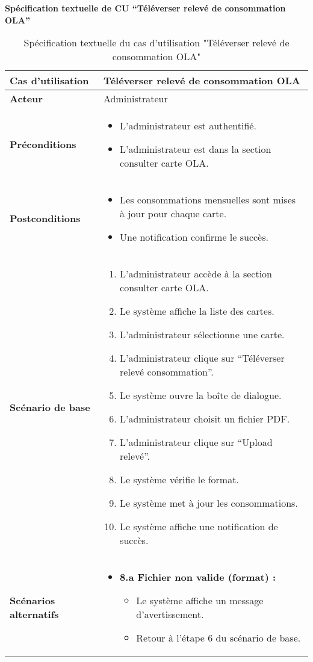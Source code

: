 \documentclass[a4paper,11pt]{report}
\begin{document}
\newpage
\textbf{Spécification textuelle de CU “Téléverser relevé de consommation OLA”}

\begin{table}[H]
  \centering
  \renewcommand{\arraystretch}{1.5}
  \caption{Spécification textuelle du cas d'utilisation "Téléverser relevé de consommation OLA"}
  \begin{tabularx}{\textwidth}{|l|X|}
    \hline
    \textbf{Cas d'utilisation} & Téléverser relevé de consommation OLA \\ \hline
    \textbf{Acteur}            & Administrateur \\ \hline
    \textbf{Préconditions}     & 
      \begin{itemize}
        \item L’administrateur est authentifié.
        \item L'administrateur est dans la section consulter carte OLA.
      \end{itemize} \\ \hline
    \textbf{Postconditions}    & 
      \begin{itemize}
        \item Les consommations mensuelles sont mises à jour pour chaque carte.
        \item Une notification confirme le succès.
      \end{itemize} \\ \hline
    \textbf{Scénario de base}  & 
      \begin{enumerate}
        \item L’administrateur accède à la section consulter carte OLA.
        \item Le système affiche la liste des cartes.
        \item L'administrateur sélectionne une carte.
        \item L'administrateur clique sur “Téléverser relevé consommation”.
        \item Le système ouvre la boîte de dialogue.
        \item L'administrateur  choisit un fichier PDF.
        \item L'administrateur clique sur “Upload relevé”.
        \item Le système vérifie le format.
        \item Le système met à jour les consommations.
        \item Le système affiche une notification de succès.
      \end{enumerate} \\ \hline
    \textbf{Scénarios alternatifs} & 
\begin{itemize}
  \item \textbf{8.a Fichier non valide (format) :}
  \begin{itemize}
    \item Le système affiche un message d'avertissement.
    \item Retour à l’étape 6 du scénario de base.
  \end{itemize}


\end{itemize}
\end{tabularx}
\end{table}
\end{document}
